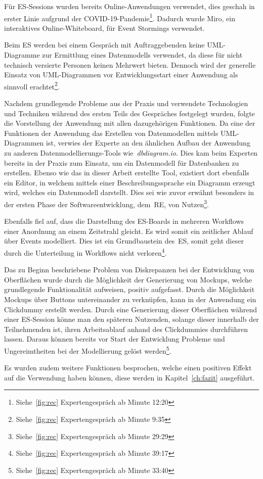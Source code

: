 Für \ac{ES}-Sessions wurden bereits Online-Anwendungen verwendet, dies geschah in erster Linie aufgrund der COVID-19-Pandemie\footnote{Siehe~\ref{fig:rec} Expertengespräch ab Minute  12:20}.
Dadurch wurde Miro, ein interaktives Online-Whiteboard, für Event Stormings verwendet.

Beim \ac{ES} werden bei einem Gespräch mit Auftraggebenden keine \ac{UML}-Diagramme zur Ermittlung eines Datenmodells verwendet,
da diese für nicht technisch versierte Personen keinen Mehrwert bieten.
Dennoch wird der generelle Einsatz von \ac{UML}-Diagrammen vor Entwicklungsstart einer Anwendung als sinnvoll erachtet\footnote{Siehe~\ref{fig:rec} Expertengespräch ab Minute  9:35}.

Nachdem grundlegende Probleme aus der Praxis und verwendete Technologien und Techniken während des ersten Teils des Gespräches festgelegt wurden,
folgte die Vorstellung der Anwendung mit allen dazugehörigen Funktionen.
Da eine der Funktionen der Anwendung das Erstellen von Datenmodellen mittels \ac{UML}-Diagrammen ist, verwies der Experte an den ähnlichen Aufbau der Anwendung
zu anderen Datenmodellierungs-Tools wie~\textit{dbdiagram.io}.
Dies kam beim Experten bereits in der Praxis zum Einsatz, um ein Datenmodell für Datenbanken zu erstellen.
Ebenso wie das in dieser Arbeit erstellte Tool, existiert dort ebenfalls ein Editor, in welchem mittels einer Beschreibungssprache ein Diagramm erzeugt wird,
welches ein Datenmodell darstellt.
Dies sei wie zuvor erwähnt besonders in der ersten Phase der Softwareentwicklung, dem~\ac{RE}, von Nutzen\footnote{Siehe~\ref{fig:rec} Expertengespräch ab Minute  29:29}.

Ebenfalls fiel auf, dass die Darstellung des \ac{ES}-Boards in mehreren Workflows einer Anordnung an einem Zeitstrahl gleicht.
Es wird somit ein zeitlicher Ablauf über Events modelliert.
Dies ist ein Grundbaustein des~\ac{ES}, somit geht dieser durch die Unterteilung in Workflows nicht verloren\footnote{Siehe~\ref{fig:rec} Expertengespräch ab Minute  39:17}.

Das zu Beginn beschriebene Problem von Diskrepanzen bei der Entwicklung von Oberflächen wurde durch die Möglichkeit der Generierung von
Mockups, welche grundlegende Funktionalität aufweisen, positiv aufgefasst.
Durch die Möglichkeit Mockups über Buttons untereinander zu verknüpfen, kann in der Anwendung ein Clickdummy erstellt werden.
Durch eine Generierung dieser Oberflächen während einer \ac{ES}-Session könne man den späteren Nutzenden, solange dieser innerhalb der Teilnehmenden ist,
ihren Arbeitsablauf anhand des Clickdummies durchführen lassen.
Daraus können bereits vor Start der Entwicklung Probleme und Ungereimtheiten bei der Modellierung gelöst werden\footnote{Siehe~\ref{fig:rec} Expertengespräch ab Minute  33:40}.

Es wurden zudem weitere Funktionen besprochen, welche einen positiven Effekt auf die Verwendung haben können, diese werden in Kapitel~\ref{ch:fazit} ausgeführt.
